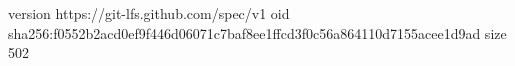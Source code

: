version https://git-lfs.github.com/spec/v1
oid sha256:f0552b2acd0ef9f446d06071c7baf8ee1ffcd3f0c56a864110d7155acee1d9ad
size 502
